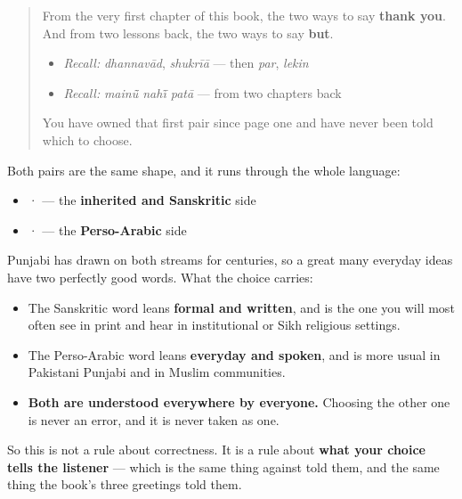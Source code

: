 \begin{quote}
From the very first chapter of this book, the two ways to say \textbf{thank you}. And from two lessons back, the two ways to say \textbf{but}.

\begin{itemize}
\raggedright
  \item \emph{Recall:} \emph{dhannavād}, \emph{shukrīā} — then \emph{par}, \emph{lekin}
  \item \emph{Recall:} \emph{mainū̃ nahī̃ patā} — from two chapters back
\end{itemize}

You have owned that first pair since page one and have never been told which to choose.
\end{quote}

\begin{cousinweb}
Both pairs are the same shape, and it runs through the whole language:

\begin{itemize}
\raggedright
  \item \textbf{} · \textbf{} — the \textbf{inherited and Sanskritic} side
  \item \textbf{} · \textbf{} — the \textbf{Perso-Arabic} side
\end{itemize}

Punjabi has drawn on both streams for centuries, so a great many everyday ideas have two perfectly good words. What the choice carries:

\begin{itemize}
\raggedright
  \item The Sanskritic word leans \textbf{formal and written}, and is the one you will most often see in print and hear in institutional or Sikh religious settings.
  \item The Perso-Arabic word leans \textbf{everyday and spoken}, and is more usual in Pakistani Punjabi and in Muslim communities.
  \item \textbf{Both are understood everywhere by everyone.} Choosing the other one is never an error, and it is never taken as one.
\end{itemize}

So this is not a rule about correctness. It is a rule about \textbf{what your choice tells the listener} — which is the same thing \textbf{} against \textbf{} told them, and the same thing the book's three greetings told them.
\end{cousinweb}

